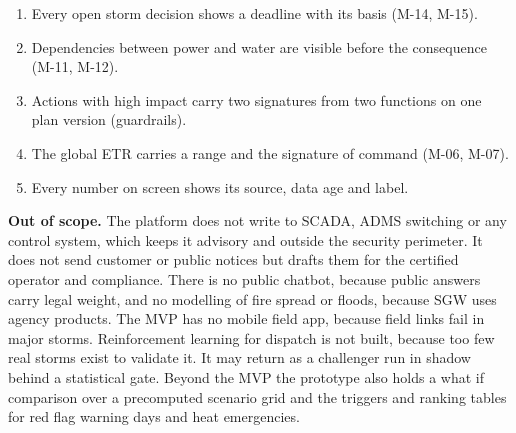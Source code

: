 \documentclass[fontsize=10pt,a4paper,DIV=12,parskip=half-,numbers=noenddot,headsepline,captions=tableheading]{scrartcl}
\begin{document}
\noindent\begin{minipage}{\linewidth}
\begin{enumerate}\setlength{\itemsep}{0pt}
  \item[G1] Every open storm decision shows a deadline with its basis (M-14, M-15).
  \item[G2] Dependencies between power and water are visible before the consequence (M-11, M-12).
  \item[G3] Actions with high impact carry two signatures from two functions on one plan version (guardrails).
  \item[G4] The global ETR carries a range and the signature of command (M-06, M-07).
  \item[G5] Every number on screen shows its source, data age and label.
\end{enumerate}
\end{minipage}\par
\textbf{Out of scope.} The platform does not write to SCADA, ADMS switching or any control system, which keeps it advisory and outside the security perimeter. It does not send customer or public notices but drafts them for the certified operator and compliance. There is no public chatbot, because public answers carry legal weight, and no modelling of fire spread or floods, because SGW uses agency products. The MVP has no mobile field app, because field links fail in major storms. Reinforcement learning for dispatch is not built, because too few real storms exist to validate it. It may return as a challenger run in shadow behind a statistical gate.
Beyond the MVP the prototype also holds a what if comparison over a precomputed scenario grid and the triggers and ranking tables for red flag warning days and heat emergencies.
\end{document}
